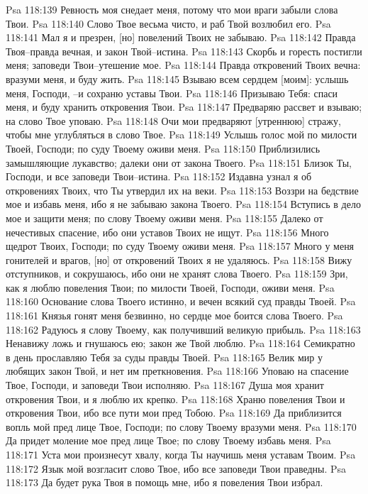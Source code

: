 Psa 118:139  Ревность моя снедает меня, потому что мои враги забыли слова Твои.
Psa 118:140  Слово Твое весьма чисто, и раб Твой возлюбил его.
Psa 118:141  Мал я и презрен, [но] повелений Твоих не забываю.
Psa 118:142  Правда Твоя--правда вечная, и закон Твой--истина.
Psa 118:143  Скорбь и горесть постигли меня; заповеди Твои--утешение мое.
Psa 118:144  Правда откровений Твоих вечна: вразуми меня, и буду жить.
Psa 118:145  Взываю всем сердцем [моим]: услышь меня, Господи, --и сохраню уставы Твои.
Psa 118:146  Призываю Тебя: спаси меня, и буду хранить откровения Твои.
Psa 118:147  Предваряю рассвет и взываю; на слово Твое уповаю.
Psa 118:148  Очи мои предваряют [утреннюю] стражу, чтобы мне углубляться в слово Твое.
Psa 118:149  Услышь голос мой по милости Твоей, Господи; по суду Твоему оживи меня.
Psa 118:150  Приблизились замышляющие лукавство; далеки они от закона Твоего.
Psa 118:151  Близок Ты, Господи, и все заповеди Твои--истина.
Psa 118:152  Издавна узнал я об откровениях Твоих, что Ты утвердил их на веки.
Psa 118:153  Воззри на бедствие мое и избавь меня, ибо я не забываю закона Твоего.
Psa 118:154  Вступись в дело мое и защити меня; по слову Твоему оживи меня.
Psa 118:155  Далеко от нечестивых спасение, ибо они уставов Твоих не ищут.
Psa 118:156  Много щедрот Твоих, Господи; по суду Твоему оживи меня.
Psa 118:157  Много у меня гонителей и врагов, [но] от откровений Твоих я не удаляюсь.
Psa 118:158  Вижу отступников, и сокрушаюсь, ибо они не хранят слова Твоего.
Psa 118:159  Зри, как я люблю повеления Твои; по милости Твоей, Господи, оживи меня.
Psa 118:160  Основание слова Твоего истинно, и вечен всякий суд правды Твоей.
Psa 118:161  Князья гонят меня безвинно, но сердце мое боится слова Твоего.
Psa 118:162  Радуюсь я слову Твоему, как получивший великую прибыль.
Psa 118:163  Ненавижу ложь и гнушаюсь ею; закон же Твой люблю.
Psa 118:164  Семикратно в день прославляю Тебя за суды правды Твоей.
Psa 118:165  Велик мир у любящих закон Твой, и нет им преткновения.
Psa 118:166  Уповаю на спасение Твое, Господи, и заповеди Твои исполняю.
Psa 118:167  Душа моя хранит откровения Твои, и я люблю их крепко.
Psa 118:168  Храню повеления Твои и откровения Твои, ибо все пути мои пред Тобою.
Psa 118:169  Да приблизится вопль мой пред лице Твое, Господи; по слову Твоему вразуми меня.
Psa 118:170  Да придет моление мое пред лице Твое; по слову Твоему избавь меня.
Psa 118:171  Уста мои произнесут хвалу, когда Ты научишь меня уставам Твоим.
Psa 118:172  Язык мой возгласит слово Твое, ибо все заповеди Твои праведны.
Psa 118:173  Да будет рука Твоя в помощь мне, ибо я повеления Твои избрал.
